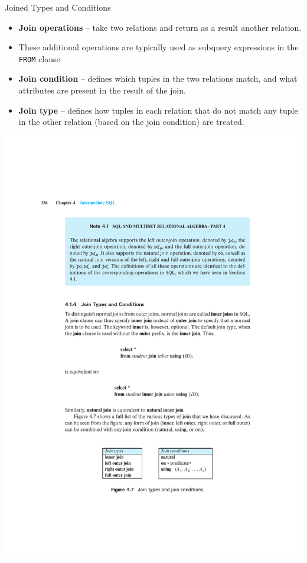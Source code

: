 \documentclass{beamer}
\begin{document}
\begin{frame}{Joined Types and Conditions}
    \begin{itemize}
        \item \textbf{Join operations} – take two relations and return as a result another relation.
        \item These additional operations are typically used as subquery expressions in the \texttt{FROM} clause
        \item \textbf{Join condition} – defines which tuples in the two relations match, and what attributes are present in the result of the join.
        \item \textbf{Join type} – defines how tuples in each relation that do not match any tuple in the other relation (based on the join condition) are treated.
    \end{itemize}
    \centering
    \includegraphics[width=\textwidth, trim={5cm 5.5cm 5cm 21.5cm}, clip]{pages/joins.pdf}
\end{frame}
\end{document}
